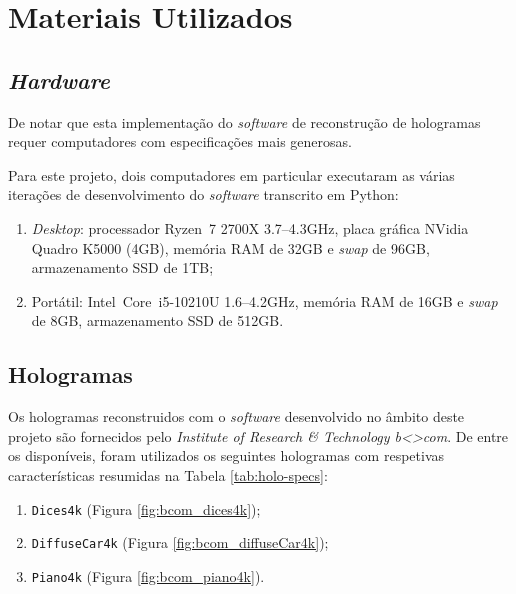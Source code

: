 \section{Materiais Utilizados}
\label{sec::tecno-ferr:materiais}

\subsection{\textit{Hardware}}
\label{ssec::tecno-ferr:materiais:hardware}

De notar que esta implementação do \textit{software} de reconstrução de hologramas requer computadores com especificações mais generosas.

Para este projeto, dois computadores em particular executaram as várias iterações de desenvolvimento do \textit{software} transcrito em Python:
\begin{enumerate}
    \item \textit{Desktop}: processador Ryzen\texttrademark~7 2700X \@ 3.7--4.3GHz, placa gráfica NVidia\textsuperscript{\textregistered} Quadro K5000 (4GB), memória RAM de 32GB e \textit{swap} de 96GB, armazenamento SSD de 1TB;
    \item Portátil: Intel\textsuperscript{\textregistered}~Core\texttrademark~i5-10210U \@ 1.6--4.2GHz, memória RAM de 16GB e \textit{swap} de 8GB, armazenamento SSD de 512GB.
\end{enumerate}

\subsection{Hologramas}
\label{ssec::tecno-ferr:materiais:hologramas}

Os hologramas reconstruidos com o \textit{software} desenvolvido no âmbito deste projeto são fornecidos pelo \textit{Institute of Research \& Technology b<>com}\cite{Gilles2016,Gilles2016a,holorepo2018}. De entre os disponíveis, foram utilizados os seguintes hologramas com respetivas características resumidas na Tabela \ref{tab:holo-specs}:

\begin{enumerate}
    \item \texttt{Dices4k} (Figura \ref{fig:bcom_dices4k});
    \item \texttt{DiffuseCar4k} (Figura \ref{fig:bcom_diffuseCar4k});
    \item \texttt{Piano4k} (Figura \ref{fig:bcom_piano4k}).
\end{enumerate}


